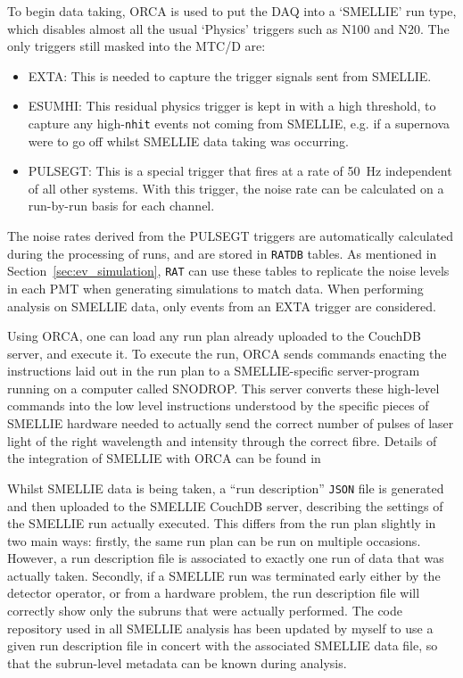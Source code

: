To begin data taking, ORCA is used to put the DAQ into a `SMELLIE' run type, which disables almost all the usual `Physics' triggers such as N100 and N20. The only triggers still masked into the MTC/D are:
\begin{itemize}
    \item EXTA: This is needed to capture the trigger signals sent from SMELLIE.
    \item ESUMHI: This residual physics trigger is kept in with a high threshold, to capture any high-\texttt{nhit} events not coming from SMELLIE, e.g. if a supernova were to go off whilst SMELLIE data taking was occurring.
    \item PULSEGT: This is a special trigger that fires at a rate of \SI{50}{\Hz} independent of all other systems. With this trigger, the noise rate can be calculated on a run-by-run basis for each channel.
\end{itemize}
The noise rates derived from the PULSEGT triggers are automatically calculated during the processing of runs, and are stored in \texttt{RATDB} tables. As mentioned in Section~\ref{sec:ev_simulation}, \texttt{RAT} can use these tables to replicate the noise levels in each PMT when generating simulations to match data. When performing analysis on SMELLIE data, only events from an EXTA trigger are considered.

Using ORCA, one can load any run plan already uploaded to the CouchDB server, and execute it. To execute the run, ORCA sends commands enacting the instructions laid out in the run plan to a SMELLIE-specific server-program running on a computer called SNODROP. This server converts these high-level commands into the low level instructions understood by the specific pieces of SMELLIE hardware needed to actually send the correct number of pulses of laser light of the right wavelength and intensity through the correct fibre. Details of the integration of SMELLIE with ORCA can be found in~\cite{jonesFutureSearchesRare2016}

Whilst SMELLIE data is being taken, a ``run description'' \texttt{JSON} file is generated and then uploaded to the SMELLIE CouchDB server, describing the settings of the SMELLIE run actually executed. This differs from the run plan slightly in two main ways: firstly, the same run plan can be run on multiple occasions. However, a run description file is associated to exactly one run of data that was actually taken. Secondly, if a SMELLIE run was terminated early either by the detector operator, or from a hardware problem, the run description file will correctly show only the subruns that were actually performed. The code repository used in all SMELLIE analysis has been updated by myself to use a given run description file in concert with the associated SMELLIE data file, so that the subrun-level metadata can be known during analysis.


